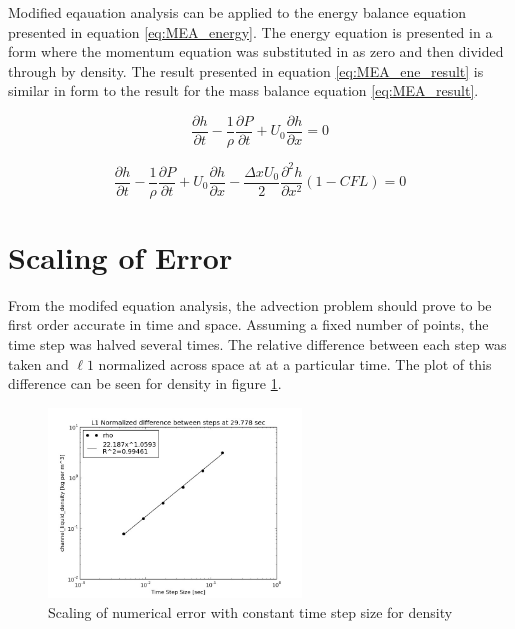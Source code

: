     Modified eqauation analysis can be applied to the energy balance equation
    presented in equation \ref{eq:MEA_energy}. The energy equation is presented in a form where
    the momentum equation was substituted in as zero and then divided through by
    density. The result presented in equation \ref{eq:MEA_ene_result} is similar in
    form to the result for the mass balance equation \ref{eq:MEA_result}.
    
    \begin{equation}
    	\label{eq:MEA_energy}
    	\frac{\partial h}{\partial t} - \frac{1}{\rho} \frac{\partial P}{\partial t} +
    	U_{0} \frac{\partial h}{\partial x} = 0
    \end{equation}
    
    \begin{equation}
    \label{eq:MEA_ene_result}
    	\frac{\partial h}{\partial t} - \frac{1}{\rho} \frac{\partial P}{\partial t} +
    	U_{0} \frac{\partial h}{\partial x} - 
    	\frac{\Delta x U_{0}}{2} \frac{\partial^2 h}{\partial x^2}
    	\left( 1 - CFL \right)
    	= 0
    \end{equation}
    
    \section{Scaling of Error}

	From the modifed equation analysis, the advection problem should prove to
	be first order accurate in time and space. Assuming a fixed number of points,
	the time step was halved several times. The relative difference between each
	step was taken and $\ell 1$ normalized across space at at a particular time.
	The plot of this difference can be seen for density in figure
	\ref{fig:Difference_rho}. 
    
    
    
    \begin{figure}[!h]
    	\centering
    	\includegraphics[width=0.60\textwidth]{images/Isokinetic_Advection/Difference_rho}
    	\caption{Scaling of numerical error with constant time step size for
    	density}
    	\label{fig:Difference_rho}
    \end{figure}
    
